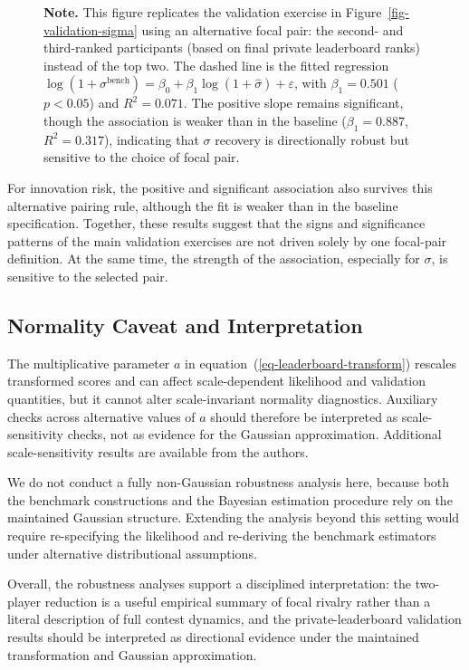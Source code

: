 \documentclass[mnsc]{informs3}
\begin{document}
\begin{figure}[tbp]
\begin{minipage}{\textwidth}
{\footnotesize
\textbf{Note.} This figure replicates the validation exercise in Figure~\ref{fig-validation-sigma} using an alternative focal pair: the second- and third-ranked participants (based on final private leaderboard ranks) instead of the top two. The dashed line is the fitted regression $\log(1 + \sigma^{\mathrm{bench}}) = \beta_0 + \beta_1 \log(1 + \hat{\sigma}) + \varepsilon$, with $\beta_1 = 0.501$ ($p < 0.05$) and $R^2 = 0.071$. The positive slope remains significant, though the association is weaker than in the baseline ($\beta_1 = 0.887$, $R^2 = 0.317$), indicating that $\sigma$ recovery is directionally robust but sensitive to the choice of focal pair.
}
\end{minipage}
\end{figure}

For innovation risk, the positive and significant association also survives this alternative pairing rule, although the fit is weaker than in the baseline specification.
Together, these results suggest that the signs and significance patterns of the main validation exercises are not driven solely by one focal-pair definition. At the same time, the strength of the association, especially for $\sigma$, is sensitive to the selected pair.


\subsection{Normality Caveat and Interpretation}\label{sect-robust-normality}

The multiplicative parameter $a$ in equation~(\ref{eq-leaderboard-transform}) rescales transformed scores and can affect scale-dependent likelihood and validation quantities, but it cannot alter scale-invariant normality diagnostics. Auxiliary checks across alternative values of $a$ should therefore be interpreted as scale-sensitivity checks, not as evidence for the Gaussian approximation. Additional scale-sensitivity results are available from the authors.

We do not conduct a fully non-Gaussian robustness analysis here, because both the benchmark constructions and the Bayesian estimation procedure rely on the maintained Gaussian structure.
Extending the analysis beyond this setting would require re-specifying the likelihood and re-deriving the benchmark estimators under alternative distributional assumptions.

Overall, the robustness analyses support a disciplined interpretation: the two-player reduction is a useful empirical summary of focal rivalry rather than a literal description of full contest dynamics, and the private-leaderboard validation results should be interpreted as directional evidence under the maintained transformation and Gaussian approximation.
\end{document}
